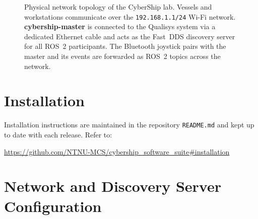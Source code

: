 \documentclass[12pt,a4paper]{article}
\begin{document}
\begin{figure}[htbp]
		\caption{Physical network topology of the CyberShip lab. Vessels and workstations
			communicate over the \texttt{192.168.1.1/24} Wi-Fi network.
			\textbf{cybership-master} is connected to the Qualisys system via a dedicated Ethernet
			cable and acts as the Fast~DDS discovery server for all ROS~2 participants.
			The Bluetooth joystick pairs with the master and its events are forwarded as ROS~2
			topics across the network.}
		\label{fig:topology}
	\end{figure}
	
	\section{Installation}
	\label{sec:installation}
	
	Installation instructions are maintained in the repository \texttt{README.md} and kept
	up to date with each release. Refer to:
	
	\begin{center}
		\url{https://github.com/NTNU-MCS/cybership_software_suite#installation}
	\end{center}
	
	\section{Network and Discovery Server Configuration}
	\label{sec:network}
	
\end{document}
